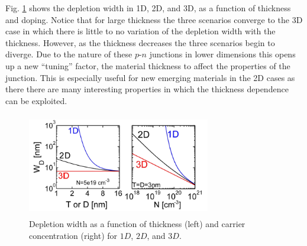 Fig. \ref{fig:fig08} shows the depletion width in 1D, 2D, and 3D,  as a function of thickness and doping. Notice that for large thickness
the three scenarios converge to the 3D case in which there is little to no variation of the depletion width with the thickness.
However, as the thickness decreases the three scenarios begin to diverge. Due to the nature of these $p$-$n$ junctions in lower dimensions this opens up
a new ``tuning'' factor, the material thickness to affect the properties of the junction. This is especially useful for new emerging materials in the 2D cases as there
there are many interesting properties in which the thickness dependence can be exploited.
\begin{figure}[h!]\label{fig:fig08}
    \centering
    \includegraphics[height=4.5cm,width=8cm]{figs/2d_3d_wd_dep}
    \caption{Depletion width as a function of thickness (left) and carrier concentration (right) for $1D$, $2D$, and $3D$.}
\end{figure} 